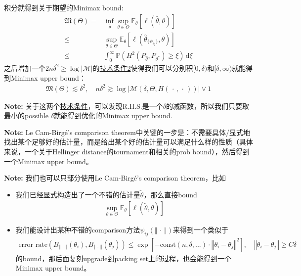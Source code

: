 \documentclass[11pt,a4paper]{ctexart}
\numberwithin{equation}{section}%
\begin{document}
\begin{enumerate}[topsep=2pt,itemsep=2pt]
    积分就得到关于期望的Minimax bound:
    \begin{align*}
        \mathfrak{M}(\Theta) =& \mathop{ \inf  }\limits_{\hat{\theta }} \mathop{ \sup  }\limits_{\theta \in \Theta} \mathbb{E}_\theta\left[ \ell(\hat{\theta},\theta) \right] \\
        \leq & \mathop{ \sup  }\limits_{\theta \in \Theta} \mathbb{E}_\theta\left[ \ell(\hat{\theta}_{\{\psi_{ij}\}},\theta) \right] \\
        \leq & \int _0^\infty \mathbb{P}\left( H^2(P_{\hat{\theta }}, P_{\theta^*}) \geq \xi  \right)  \,\mathrm{d}\xi 
    \end{align*}
    之后增加一个$ 2n\delta ^2 \geq \log \left\vert \mathcal{M} \right\vert  $的\uline{技术条件2}使得我们可以分别积$ [0,\delta ) $和$ [\delta,\infty ) $就能得到Minimax upper bound：
    \begin{align*}
        \mathfrak{M}(\Theta)  \lesssim \delta ^2,\quad n\delta ^2 \gtrsim \log \left\vert \mathcal{M}(\delta , \Theta , H(\, \cdot \, ,\, \cdot \, )) \right\vert \vee 1
    \end{align*}
    
    \textbf{Note: }关于这两个\uline{技术条件}，可以发现$  \mathrm{R.H.S.}  $是一个$ \delta  $的减函数，所以我们只要取最小的possible $ \delta  $就能得到优化的Minimax upper bound.
    
    
\end{enumerate}

    
\textbf{Note: }Le Cam-Birg\'e's comparison theorem中关键的一步是：不需要具体/显式地找出某个足够好的估计量，而是给出某个好的估计量可以满足什么样的性质（具体来说，一个关于Hellinger distance的tournament和相关的prob bound），然后得到一个Minimax upper bound。

\textbf{Note: }我们也可以只部分使用Le Cam-Birg\'e's comparison theorem，比如
\begin{itemize}[topsep=2pt,itemsep=0pt]
    \item 我们已经显式构造出了一个不错的估计量$ \tilde{\theta } $，那么直接bound
    \begin{align*}
        \sup_{\theta \in \Theta} \mathbb{E}_\theta\left[ \ell(\tilde{\theta } ,\theta) \right] 
    \end{align*}
    \item 我们能设计出某种不错的comparison方法$ \psi_{ij}(\left\Vert \, \cdot \,  \right\Vert ) $来得到一个类似于
    \begin{align*}
        \text{error rate}(B_{\left\Vert \, \cdot \,  \right\Vert }(\theta _i), B_{\left\Vert \, \cdot \,  \right\Vert }(\theta _j)) \leq \exp\left[ -\mathrm{const}(n,\delta,... )\cdot \left\Vert \theta _i-\theta _j \right\Vert ^2 \right],\quad \left\Vert \theta _i-\theta _j \right\Vert \geq C\delta
    \end{align*}
    的bound，那后面复刻upgrade到packing set上的过程，也会能得到一个Minimax upper bound。
    
    
    
\end{itemize}
\end{document}
